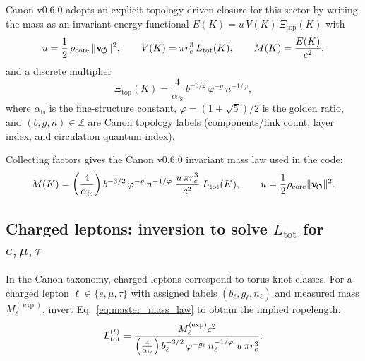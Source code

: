 \documentclass[10pt]{article}
\newcommand{\vswirl}{\mathbf{v}_{\!\boldsymbol{\circlearrowleft}}}
\begin{document}
        Canon v0.6.0 adopts an explicit topology-driven closure for this sector by writing the mass as an invariant
        energy functional $E(K)=u\,V(K)\,\Xi_{\text{top}}(K)$ with
        \begin{equation}
            u=\frac12\,\rho_{\text{core}}\,\|\vswirl\|^2,
            \qquad
            V(K)=\pi \rc^3\,L_{\text{tot}}(K),
            \qquad
            M(K)=\frac{E(K)}{c^2},
            \label{eq:mass_kernel_uv}
        \end{equation}
        and a discrete multiplier
        \begin{equation}
            \Xi_{\text{top}}(K)=\frac{4}{\alpha_\textrm{fs}}\,b^{-3/2}\,\varphi^{-g}\,n^{-1/\varphi},
            \label{eq:Xi_top}
        \end{equation}
        where $\alpha_\textrm{fs}$ is the fine-structure constant, $\varphi=(1+\sqrt5)/2$ is the golden ratio,
        and $(b,g,n)\in\mathbb Z$ are Canon topology labels (components/link count, layer index, and circulation quantum index).

        Collecting factors gives the Canon v0.6.0 invariant mass law used in the code:
        \begin{equation}
            M(K)=
            \left(\frac{4}{\alpha_\textrm{fs}}\right)
            b^{-3/2}\,\varphi^{-g}\,n^{-1/\varphi}\;
            \frac{u\,\pi \rc^3}{c^2}\;L_{\text{tot}}(K),
            \qquad
            u=\frac12\rho_{\text{core}}\|\vswirl\|^2.
            \label{eq:master_mass_law}
        \end{equation}

    \subsection{Charged leptons: inversion to solve $L_{\text{tot}}$ for $e,\mu,\tau$}

        In the Canon taxonomy, charged leptons correspond to torus-knot classes.
        For a charged lepton $\ell\in\{e,\mu,\tau\}$ with assigned labels $(b_\ell,g_\ell,n_\ell)$ and measured mass $M_\ell^{(\mathrm{\exp})}$,
        invert Eq.~\eqref{eq:master_mass_law} to obtain the implied ropelength:
        \begin{equation}
            L_{\text{tot}}^{(\ell)}=
            \frac{M_\ell^{(\mathrm{\exp})}c^2}{
                \left(\frac{4}{\alpha_{\rm fs}}\right)
                b_\ell^{-3/2}\,\varphi^{-g_\ell}\,n_\ell^{-1/\varphi}\;
                u\,\pi r_c^3 }.
            \label{eq:Ltot_inversion}
        \end{equation}
\end{document}
